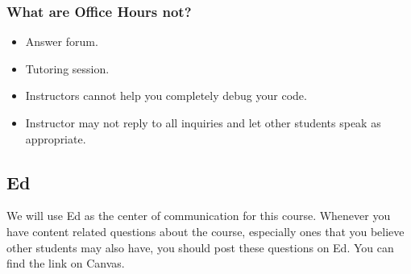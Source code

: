 \subsubsection{What are Office Hours not?}

\begin{itemize}
    \item Answer forum.
    \item Tutoring session.
    \item Instructors cannot help you completely debug your code.
    \item Instructor may not reply to all inquiries and let other students speak as appropriate.
\end{itemize}
    

\subsection{Ed}

We will use Ed as the center of communication for this course. Whenever you have content related questions about the course, especially ones that you believe other students may also have, you should post these questions on Ed. You can find the link on Canvas. 



